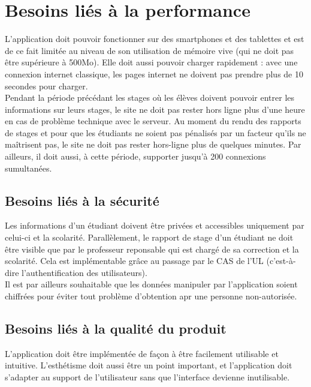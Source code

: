 \documentclass{scrreprt}
\begin{document}
\section{Besoins liés à la performance}
\hspace{1cm}L'application doit pouvoir fonctionner sur des smartphones et des tablettes et est de ce fait limitée au niveau de son utilisation de mémoire vive (qui ne doit pas être supérieure à 500Mo). Elle doit aussi pouvoir charger rapidement : avec une connexion internet classique, les pages internet ne doivent pas prendre plus de 10 secondes pour charger.\\

\hspace{0.6cm}Pendant la période précédant les stages où les élèves doivent pouvoir entrer les informations sur leurs stages, le site ne doit pas rester hors ligne plus d'une heure en cas de problème technique avec le serveur. Au moment du rendu des rapports de stages et pour que les étudiants ne soient pas pénalisés par un facteur qu'ils ne maîtrisent pas, le site ne doit pas rester hors-ligne plus de quelques minutes. Par ailleurs, il doit aussi, à cette période, supporter jusqu'à 200 connexions sumultanées.

\subsection{Besoins liés à la sécurité}
\hspace{1cm}Les informations d'un étudiant doivent être privées et accessibles uniquement par celui-ci et la scolarité. Parallèlement, le rapport de stage d'un étudiant ne doit être visible que par le professeur reponsable qui est chargé de sa correction et la scolarité. Cela est implémentable grâce au passage par le CAS de l'UL (c'est-à-dire l'authentification des utilisateurs).\\

\hspace{0.6cm}Il est par ailleurs souhaitable que les données manipuler par l'application soient chiffrées pour éviter tout problème d'obtention apr une personne non-autorisée.

\subsection{Besoins liés à la qualité du produit }
\hspace{1cm}L'application doit être implémentée de façon à être facilement utilisable et intuitive. L'esthétisme doit aussi être un point important, et l'application doit s'adapter au support de l'utilisateur sans que l'interface devienne inutilisable.\\
\end{document}
